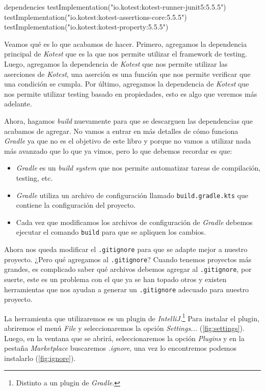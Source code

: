   \begin{kotlin}
    dependencies {
        testImplementation("io.kotest:kotest-runner-junit5:5.5.5")
        testImplementation("io.kotest:kotest-assertions-core:5.5.5")
        testImplementation("io.kotest:kotest-property:5.5.5")
    }
  \end{kotlin}

  Veamos qué es lo que acabamos de hacer.
  Primero, agregamos la dependencia principal de \textit{Kotest} que es la que nos permite
  utilizar el framework de testing.
  Luego, agregamos la dependencia de \textit{Kotest} que nos permite utilizar las aserciones de 
  \textit{Kotest}, una aserción es una función que nos permite verificar que una condición se 
  cumpla.
  Por último, agregamos la dependencia de \textit{Kotest} que nos permite utilizar testing basado
  en propiedades, esto es algo que veremos más adelante.

  Ahora, hagamos \textit{build} nuevamente para que se descarguen las dependencias que acabamos
  de agregar.
  No vamos a entrar en más detalles de cómo funciona \textit{Gradle} ya que no es el objetivo de
  este libro y porque no vamos a utilizar nada más avanzado que lo que ya vimos, pero lo que debemos
  recordar es que:

  \begin{itemize}
    \item \textit{Gradle} es un \textit{build system} que nos permite automatizar tareas de
      compilación, testing, etc.
    \item \textit{Gradle} utiliza un archivo de configuración llamado \texttt{build.gradle.kts}
      que contiene la configuración del proyecto.
    \item Cada vez que modificamos los archivos de configuración de \textit{Gradle} debemos
      ejecutar el comando \texttt{build} para que se apliquen los cambios.
  \end{itemize}

  Ahora nos queda modificar el \texttt{.gitignore} para que se adapte mejor a nuestro proyecto.
  ¿Pero qué agregamos al \texttt{.gitignore}?
  Cuando tenemos proyectos más grandes, es complicado saber qué archivos debemos agregar al
  \texttt{.gitignore}, por suerte, este es un problema con el que ya se han topado otros y existen
  herramientas que nos ayudan a generar un \texttt{.gitignore} adecuado para nuestro proyecto.

  La herramienta que utilizaremos es un plugin de \textit{IntelliJ}.\footnote{
    Distinto a un plugin de \textit{Gradle}.
  }
  Para instalar el plugin, abriremos el menú \textit{File} y seleccionaremos la opción
  \textit{Settings...} (\cref{fig:settings}).
  Luego, en la ventana que se abrirá, seleccionaremos la opción \textit{Plugins} y en la pestaña
  \textit{Marketplace} buscaremos \textit{.ignore}, una vez lo encontremos podemos instalarlo
  (\cref{fig:ignore}).

